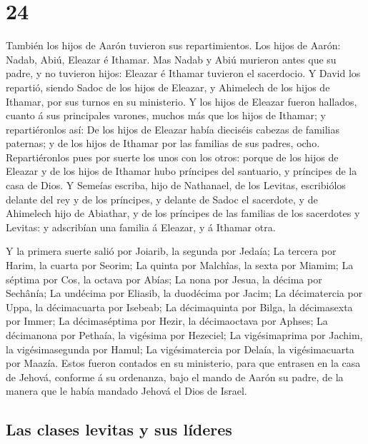 \hypertarget{section-23}{%
\section{24}\label{section-23}}

 También los hijos de Aarón tuvieron sus repartimientos. Los
hijos de Aarón: Nadab, Abiú, Eleazar é Ithamar.  Mas Nadab y
Abiú murieron antes que su padre, y no tuvieron hijos: Eleazar é Ithamar
tuvieron el sacerdocio.  Y David los repartió, siendo Sadoc
de los hijos de Eleazar, y Ahimelech de los hijos de Ithamar, por sus
turnos en su ministerio.  Y los hijos de Eleazar fueron
hallados, cuanto á sus principales varones, muchos más que los hijos de
Ithamar; y repartiéronlos así: De los hijos de Eleazar había dieciséis
cabezas de familias paternas; y de los hijos de Ithamar por las familias
de sus padres, ocho.  Repartiéronlos pues por suerte los
unos con los otros: porque de los hijos de Eleazar y de los hijos de
Ithamar hubo príncipes del santuario, y príncipes de la casa de Dios.
 Y Semeías escriba, hijo de Nathanael, de los Levitas,
escribiólos delante del rey y de los príncipes, y delante de Sadoc el
sacerdote, y de Ahimelech hijo de Abiathar, y de los príncipes de las
familias de los sacerdotes y Levitas: y adscribían una familia á
Eleazar, y á Ithamar otra.

 Y la primera suerte salió por Joiarib, la segunda por
Jedaía;  La tercera por Harim, la cuarta por Seorim;
 La quinta por Malchîas, la sexta por Miamim; 
La séptima por Cos, la octava por Abías;  La nona por
Jesua, la décima por Sechânía;  La undécima por Eliasib, la
duodécima por Jacim;  La décimatercia por Uppa, la
décimacuarta por Isebeab;  La décimaquinta por Bilga, la
décimasexta por Immer;  La décimaséptima por Hezir, la
décimaoctava por Aphses;  La décimanona por Pethaía, la
vigésima por Hezeciel;  La vigésimaprima por Jachim, la
vigésimasegunda por Hamul;  La vigésimatercia por Delaía,
la vigésimacuarta por Maazía.  Estos fueron contados en su
ministerio, para que entrasen en la casa de Jehová, conforme á su
ordenanza, bajo el mando de Aarón su padre, de la manera que le había
mandado Jehová el Dios de Israel.

\hypertarget{las-clases-levitas-y-sus-luxedderes}{%
\subsection{Las clases levitas y sus
líderes}\label{las-clases-levitas-y-sus-luxedderes}}

